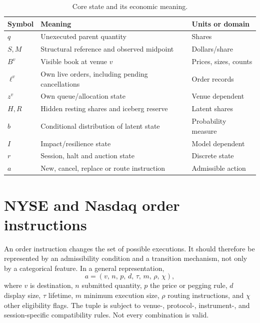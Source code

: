 \documentclass[11pt]{article}
\numberwithin{equation}{section}
\theoremstyle{definition}
\theoremstyle{remark}
\theoremstyle{definition}
\begin{document}
\begin{table}[tb]
\centering\small
\caption{Core state and its economic meaning.}
\begin{tabularx}{\textwidth}{lYl}
\toprule Symbol & Meaning & Units or domain \\\midrule
$q$ & Unexecuted parent quantity & Shares \\
$S,M$ & Structural reference and observed midpoint & Dollars/share \\
$B^v$ & Visible book at venue $v$ & Prices, sizes, counts \\
$\ell^v$ & Own live orders, including pending cancellations & Order records \\
$z^v$ & Own queue/allocation state & Venue dependent \\
$H,R$ & Hidden resting shares and iceberg reserve & Latent shares \\
$b$ & Conditional distribution of latent state & Probability measure \\
$I$ & Impact/resilience state & Model dependent \\
$r$ & Session, halt and auction state & Discrete state \\
$a$ & New, cancel, replace or route instruction & Admissible action \\
\bottomrule
\end{tabularx}
\end{table}

\section{NYSE and Nasdaq order instructions}\label{sec:types}

An order instruction changes the set of possible executions. It should therefore
be represented by an admissibility condition and a transition mechanism, not
only by a categorical feature. In a general representation,
\begin{equation}\label{eq:actiontuple}
 a=(v,\,n,\,p,\,d,\,\tau,\,m,\,\rho,\,\chi),
\end{equation}
where $v$ is destination, $n$ submitted quantity, $p$ the price or pegging rule,
$d$ display size, $\tau$ lifetime, $m$ minimum execution size, $\rho$ routing
instructions, and $\chi$ other eligibility flags. The tuple is subject to
venue-, protocol-, instrument-, and session-specific compatibility rules.
Not every combination is valid.
\end{document}
